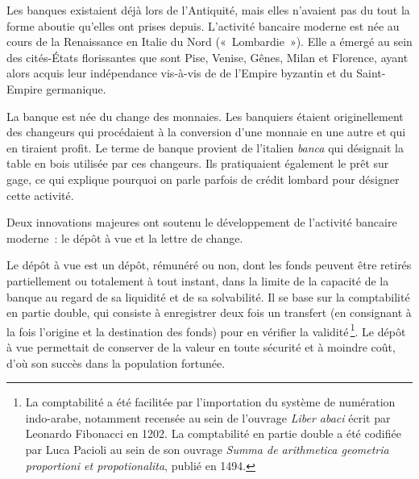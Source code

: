 \documentclass[a4paper,notitlepage]{article}
\newcommand{\sfootnote}{\,\footnote}
\begin{document}


Les banques existaient déjà lors de l'Antiquité, mais elles n'avaient pas du tout la forme aboutie qu'elles ont prises depuis. L'activité bancaire moderne est née au cours de la Renaissance en Italie du Nord («~Lombardie~»). Elle a émergé au sein des cités-États florissantes que sont Pise, Venise, Gênes, Milan et Florence, ayant alors acquis leur indépendance vis-à-vis de de l'Empire byzantin et du Saint-Empire germanique.  %

La banque est née du change des monnaies. Les banquiers étaient originellement des changeurs qui procédaient à la conversion d'une monnaie en une autre et qui en tiraient profit. Le terme de banque provient de l'italien \emph{banca} qui désignait la table en bois utilisée par ces changeurs. Ils pratiquaient également le prêt sur gage, ce qui explique pourquoi on parle parfois de crédit lombard pour désigner cette activité.

Deux innovations majeures ont soutenu le développement de l'activité bancaire moderne~: le dépôt à vue et la lettre de change.

Le dépôt à vue est un dépôt, rémunéré ou non, dont les fonds peuvent être retirés partiellement ou totalement à tout instant, dans la limite de la capacité de la banque au regard de sa liquidité et de sa solvabilité. Il se base sur la comptabilité en partie double, qui consiste à enregistrer deux fois un transfert (en consignant à la fois l'origine et la destination des fonds) pour en vérifier la validité\sfootnote{La comptabilité a été facilitée par l'importation du système de numération indo-arabe, notamment recensée au sein de l'ouvrage \emph{Liber abaci} écrit par Leonardo Fibonacci en 1202. La comptabilité en partie double a été codifiée par Luca Pacioli au sein de son ouvrage \emph{Summa de arithmetica geometria proportioni et propotionalita}, publié en 1494.}. Le dépôt à vue permettait de conserver de la valeur en toute sécurité et à moindre coût, d'où son succès dans la population fortunée.
\end{document}
